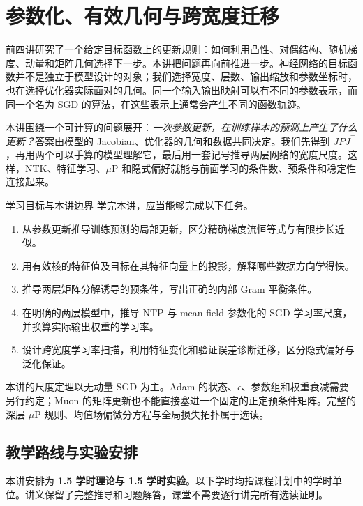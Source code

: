 \chapter{参数化、有效几何与跨宽度迁移}
\label{l5:chapter}

前四讲研究了一个给定目标函数上的更新规则：如何利用凸性、对偶结构、随机梯度、动量和矩阵几何选择下一步。本讲把问题再向前推进一步。神经网络的目标函数并不是独立于模型设计的对象；我们选择宽度、层数、输出缩放和参数坐标时，也在选择优化器实际面对的几何。同一个输入输出映射可以有不同的参数表示，而同一个名为 SGD 的算法，在这些表示上通常会产生不同的函数轨迹。

本讲围绕一个可计算的问题展开：\emph{一次参数更新，在训练样本的预测上产生了什么更新？}答案由模型的 Jacobian、优化器的几何和数据共同决定。我们先得到 $JPJ^\top$，再用两个可以手算的模型理解它，最后用一套记号推导两层网络的宽度尺度。这样，NTK、特征学习、$\mu$P 和隐式偏好就能与前面学习的条件数、预条件和稳定性连接起来。

\begin{coursebox}{学习目标与本讲边界}
学完本讲，应当能够完成以下任务。
\begin{enumerate}
  \item 从参数更新推导训练预测的局部更新，区分精确梯度流恒等式与有限步长近似。
  \item 用有效核的特征值及目标在其特征向量上的投影，解释哪些数据方向学得快。
  \item 推导两层矩阵分解诱导的预条件，写出正确的内部 Gram 平衡条件。
  \item 在明确的两层模型中，推导 NTP 与 mean-field 参数化的 SGD 学习率尺度，并换算实际输出权重的学习率。
  \item 设计跨宽度学习率扫描，利用特征变化和验证误差诊断迁移，区分隐式偏好与泛化保证。
\end{enumerate}
本讲的尺度定理以无动量 SGD 为主。Adam 的状态、$\epsilon$、参数组和权重衰减需要另行约定；Muon 的矩阵更新也不能直接塞进一个固定的正定预条件矩阵。完整的深层 $\mu$P 规则、均值场偏微分方程与全局损失拓扑属于选读。
\end{coursebox}

\section{教学路线与实验安排}
\label{l5:route}

本讲安排为 \textbf{1.5 学时理论与 1.5 学时实验}。以下学时均指课程计划中的学时单位。讲义保留了完整推导和习题解答，课堂不需要逐行讲完所有选读证明。

